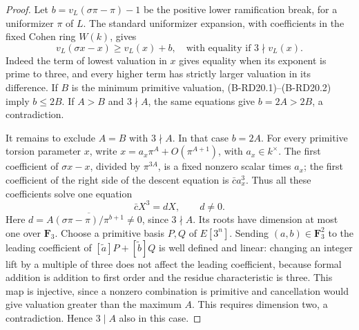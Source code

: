 \begin{proof}
Let $b=v_L(\sigma\pi-\pi)-1$ be the positive lower ramification
break, for a uniformizer $\pi$ of $L$. The standard uniformizer
expansion, with coefficients in the fixed Cohen ring $W(k)$, gives
\[
 v_L(\sigma x-x)\geq v_L(x)+b,
 \quad\text{with equality if }3\nmid v_L(x).       \tag{B-RD20.2}
\]
Indeed the term of lowest valuation in $x$ gives equality when its
exponent is prime to three, and every higher term has strictly
larger valuation in its difference. If $B$ is the minimum primitive
valuation, (B-RD20.1)--(B-RD20.2) imply $b\leq2B$. If $A>B$ and
$3\nmid A$, the same equations give $b=2A>2B$, a contradiction.

It remains to exclude $A=B$ with $3\nmid A$. In that case $b=2A$.
For every primitive torsion parameter $x$, write
$x=a_x\pi^A+O(\pi^{A+1})$, with $a_x\in k^\times$. The first
coefficient of $\sigma x-x$, divided by $\pi^{3A}$, is a fixed
nonzero scalar times $a_x$; the first coefficient of the right
side of the descent equation is $\bar c a_x^3$. Thus all these
coefficients solve one equation
\[
                           \bar c X^3=dX,
                           \qquad d\ne0.
\]
Here $d=A\overline{(\sigma\pi-\pi)/\pi^{b+1}}\ne0$, since
$3\nmid A$. Its roots have dimension at most one over
$\mathbf F_3$. Choose a
primitive basis $P,Q$ of $E[3^n]$. Sending $(a,b)\in\mathbf F_3^2$
to the leading coefficient of $[\widetilde a]P+[\widetilde b]Q$
is well defined and linear: changing an integer lift by a multiple
of three does not affect the leading coefficient, because formal
addition is addition to first order and the residue characteristic
is three. This map is injective, since a nonzero combination is
primitive and cancellation would give valuation greater than the
maximum $A$. This requires dimension two, a contradiction. Hence
$3\mid A$ also in this case.
\end{proof}

